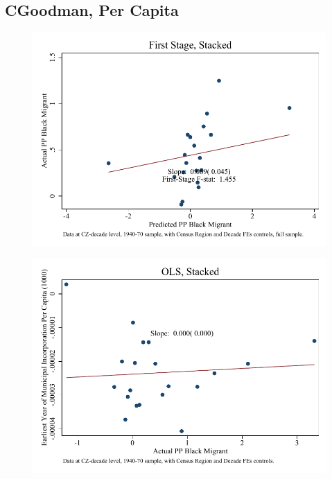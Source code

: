 \documentclass{article}
\begin{document}
\subsection{CGoodman, Per Capita}

\clearpage
\begin{figure}
\centering
\includegraphics{figures/simplefigs/stacked_cgoodman_pc_C3_full_fs.pdf}
\end{figure}
\clearpage
\begin{figure}
\centering
\includegraphics{figures/simplefigs/stacked_cgoodman_pc_C3_full_ols.pdf}
\end{figure}
\clearpage
\end{document}
